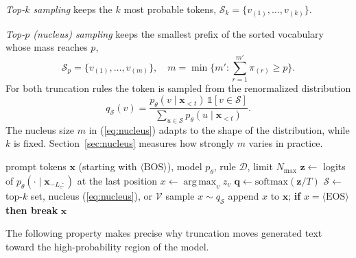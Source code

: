 \documentclass[journal]{IEEEtran}
\DeclareMathOperator*{\argmax}{arg\,max}
\newcommand{\BOS}{\langle\mathrm{BOS}\rangle}
\newcommand{\EOS}{\langle\mathrm{EOS}\rangle}
\begin{document}
\emph{Top-$k$ sampling} \cite{fan2018hierarchical} keeps the $k$ most probable tokens, $\mathcal{S}_k=\{v_{(1)},\dots,v_{(k)}\}$.

\emph{Top-$p$ (nucleus) sampling} \cite{holtzman2020curious} keeps the smallest prefix of the sorted vocabulary whose mass reaches $p$,
\begin{equation}
\mathcal{S}_p=\{v_{(1)},\dots,v_{(m)}\},\quad m=\min\Big\{m' : \sum_{r=1}^{m'}\pi_{(r)}\ge p\Big\}.
\label{eq:nucleus}
\end{equation}
For both truncation rules the token is sampled from the renormalized distribution
\begin{equation}
q_{\mathcal{S}}(v) = \frac{p_\theta(v\mid\mathbf{x}_{<t})\,\mathbb{1}[v\in\mathcal{S}]}{\sum_{u\in\mathcal{S}}p_\theta(u\mid\mathbf{x}_{<t})}.
\label{eq:renorm}
\end{equation}
The nucleus size $m$ in (\ref{eq:nucleus}) adapts to the shape of the distribution, while $k$ is fixed. Section~\ref{sec:nucleus} measures how strongly $m$ varies in practice.

\begin{algorithm}[!t]
\caption{Autoregressive generation with a decoding rule}
\label{alg:decode}
\begin{algorithmic}[1]
\Require prompt tokens $\mathbf{x}$ (starting with $\BOS$), model $p_\theta$, rule $\mathcal{D}$, limit $N_{\max}$
  \State $\mathbf{z} \gets$ logits of $p_\theta(\cdot\mid\mathbf{x}_{-L_c:})$ at the last position
   \State $x \gets \argmax_v z_v$
  \Else
    \State $\mathbf{q}\gets\mathrm{softmax}(\mathbf{z}/T)$ \Comment{(\ref{eq:temp})}
    \State $\mathcal{S}\gets$ top-$k$ set, nucleus (\ref{eq:nucleus}), or $\mathcal{V}$
    \State sample $x\sim q_{\mathcal{S}}$ \Comment{(\ref{eq:renorm})}
  \EndIf
  \State append $x$ to $\mathbf{x}$; \textbf{if} $x=\EOS$ \textbf{then break}
\EndFor
\State \Return $\mathbf{x}$
\end{algorithmic}
\end{algorithm}

The following property makes precise why truncation moves generated text toward the high-probability region of the model.
\end{document}

